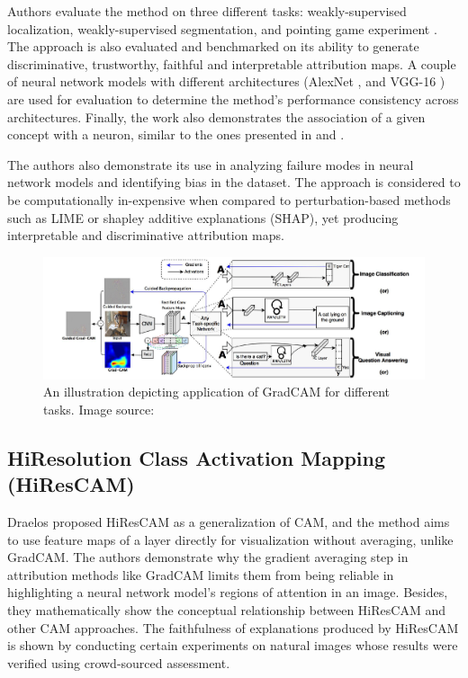 \documentclass[../report.tex]{subfiles}
\begin{document}
   Authors evaluate the method on three different tasks: weakly-supervised localization, weakly-supervised segmentation, and pointing game experiment \cite{zhang2018top}. The approach is also evaluated and benchmarked on its ability to generate discriminative, trustworthy, faithful and interpretable attribution maps. A couple of neural network models with different architectures (AlexNet \cite{krizhevsky2012imagenet}, and VGG-16 \cite{simonyan2014very}) are used for evaluation to determine the method’s performance consistency across architectures.
   Finally, the work also demonstrates the association of a given concept with a neuron, similar to the ones presented in \cite{matthew2014visualizing} and \cite{zhou2014object}.
   
	The authors also demonstrate its use in analyzing failure modes in neural network models and identifying bias in the dataset.
	The approach is considered to be computationally in-expensive when compared to perturbation-based methods such as LIME \cite{lime} or shapley additive explanations (SHAP)\cite{shap}, yet producing interpretable and discriminative attribution maps.
	 \begin{figure}[H]
		\hspace{-1cm}
		\includegraphics[scale=0.3]{images/chapter3/gradcam.png}
		\caption[An illustration depicting application of GradCAM for different tasks]{An illustration depicting application of GradCAM for different tasks. Image source: \cite{selvaraju2017grad}}
		\label{fig_gradcam}
	\end{figure}
		
\subsection{HiResolution Class Activation Mapping (HiResCAM)}
\noindent
	Draelos \etal proposed HiResCAM \cite{draelos2020hirescam} as a generalization of CAM, and the method aims to use feature maps of a layer directly for visualization without averaging, unlike GradCAM. The authors demonstrate why the gradient averaging step in attribution methods like GradCAM limits them from being reliable in highlighting a neural network model’s regions of attention in an image. Besides, they mathematically show the conceptual relationship between HiResCAM and other CAM approaches. The faithfulness of explanations produced by HiResCAM is shown by conducting certain experiments on natural images whose results were verified using crowd-sourced assessment.
	
\end{document}
